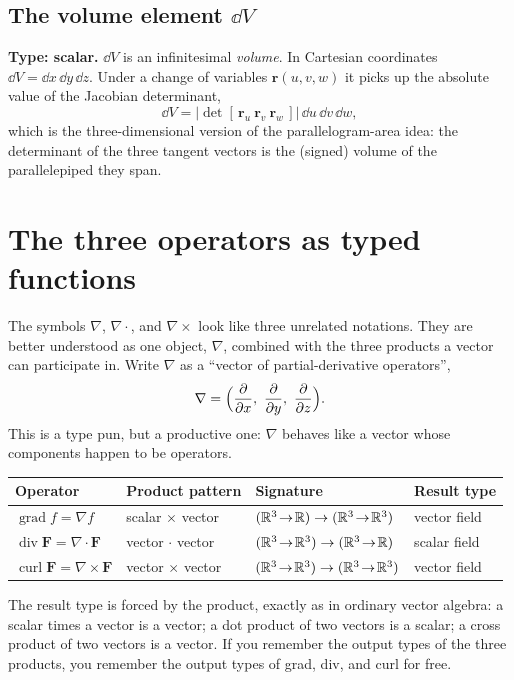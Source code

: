 \documentclass{essay}
\newcommand{\F}{\mathbf{F}}
\newcommand{\rr}{\mathbf{r}}
\newcommand{\grad}{\operatorname{grad}}
\newcommand{\dive}{\operatorname{div}}
\newcommand{\curl}{\operatorname{curl}}
\begin{document}
\subsection{The volume element $\dd V$}

\textbf{Type: scalar.} $\dd V$ is an infinitesimal \emph{volume}. In Cartesian
coordinates $\dd V = \dd x\,\dd y\,\dd z$. Under a change of variables
$\rr(u,v,w)$ it picks up the absolute value of the Jacobian determinant,
\[
  \dd V = \bigl\lvert \det[\,\rr_u\ \rr_v\ \rr_w\,] \bigr\rvert \,\dd u\,\dd v\,\dd w,
\]
which is the three-dimensional version of the parallelogram-area idea: the
determinant of the three tangent vectors is the (signed) volume of the
parallelepiped they span.

\section{The three operators as typed functions}

The symbols $\nabla$, $\nabla\cdot$, and $\nabla\times$ look like three unrelated
notations. They are better understood as one object, $\nabla$, combined with the
three products a vector can participate in. Write $\nabla$ as a ``vector of
partial-derivative operators'',
\[
  \nabla = \Bigl(\frac{\partial}{\partial x},\ \frac{\partial}{\partial y},\
  \frac{\partial}{\partial z}\Bigr).
\]
This is a type pun, but a productive one: $\nabla$ behaves like a vector whose
components happen to be operators.

\begin{center}
  \renewcommand{\arraystretch}{1.5}
  \begin{tabular}{@{}l l l l@{}}
    \toprule
    \textbf{Operator} & \textbf{Product pattern} & \textbf{Signature} & \textbf{Result type} \\
    \midrule
    $\grad f = \nabla f$           & scalar $\times$ vector & $(\mathbb{R}^3\!\to\!\mathbb{R})\to(\mathbb{R}^3\!\to\!\mathbb{R}^3)$ & vector field \\
    $\dive \F = \nabla\cdot\F$     & vector $\cdot$ vector  & $(\mathbb{R}^3\!\to\!\mathbb{R}^3)\to(\mathbb{R}^3\!\to\!\mathbb{R})$ & scalar field \\
    $\curl \F = \nabla\times\F$    & vector $\times$ vector & $(\mathbb{R}^3\!\to\!\mathbb{R}^3)\to(\mathbb{R}^3\!\to\!\mathbb{R}^3)$ & vector field \\
    \bottomrule
  \end{tabular}
\end{center}

The result type is forced by the product, exactly as in ordinary vector algebra:
a scalar times a vector is a vector; a dot product of two vectors is a scalar; a
cross product of two vectors is a vector. If you remember the output types of the
three products, you remember the output types of grad, div, and curl for free.
\end{document}
